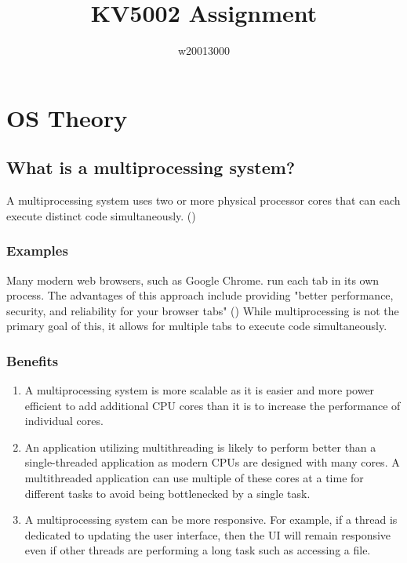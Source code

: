 \documentclass{article}
\title{KV5002 Assignment}
\author{w20013000}
\date{}
\begin{document}
\maketitle

\section{OS Theory}

\subsection{What is a multiprocessing system?}
A multiprocessing system uses two or more physical processor cores that
can each execute distinct code simultaneously. (\cite{silberschatz_operating_2018})

    \subsubsection{Examples}
    Many modern web browsers, such as Google Chrome. run each tab
    in its own process. The advantages of this approach include providing
    "better performance, security, and reliability for your browser tabs" (\cite{parmar_microsoft_2020})
    While multiprocessing is not the primary goal of this,
    it allows for multiple tabs to execute code simultaneously.

    \subsubsection{Benefits}

    \begin{enumerate}
        \item A multiprocessing system is more scalable as it is easier
              and more power efficient to add additional CPU cores than
              it is to increase the performance of individual cores.
        \item An application utilizing multithreading is likely to perform
              better than a single-threaded application as modern CPUs are
              designed with many cores. A multithreaded application can use
              multiple of these cores at a time for different tasks to avoid
              being bottlenecked by a single task.
        \item A multiprocessing system can be more responsive. For example,
              if a thread is dedicated to updating the user interface,
              then the UI will remain responsive even if other threads are
              performing a long task such as accessing a file.
    \end{enumerate}
\end{document}

